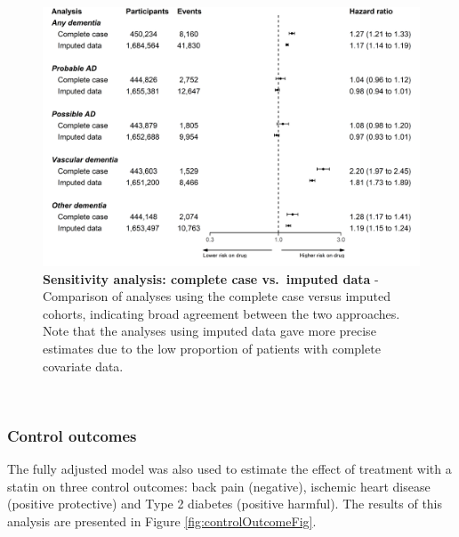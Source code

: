 \documentclass[a4paper, twoside]{templates/ociamthesis}
\begin{document}
~





\begin{figure}[H]
\includegraphics[width=1\linewidth]{figures/cprd-analysis/forester_complete_case} \caption[Sensitivity analysis: complete case vs.~imputed data]{\textbf{Sensitivity analysis: complete case vs.~imputed data} - Comparison of analyses using the complete case versus imputed cohorts, indicating broad agreement between the two approaches. Note that the analyses using imputed data gave more precise estimates due to the low proportion of patients with complete covariate data.}\label{fig:completeCaseFig}
\end{figure}

~

\hypertarget{control-outcomes-1}{%
\subsubsection{Control outcomes}\label{control-outcomes-1}}

The fully adjusted model was also used to estimate the effect of treatment with a statin on three control outcomes: back pain (negative), ischemic heart disease (positive protective) and Type 2 diabetes (positive harmful). The results of this analysis are presented in Figure \ref{fig:controlOutcomeFig}.

~
\end{document}
